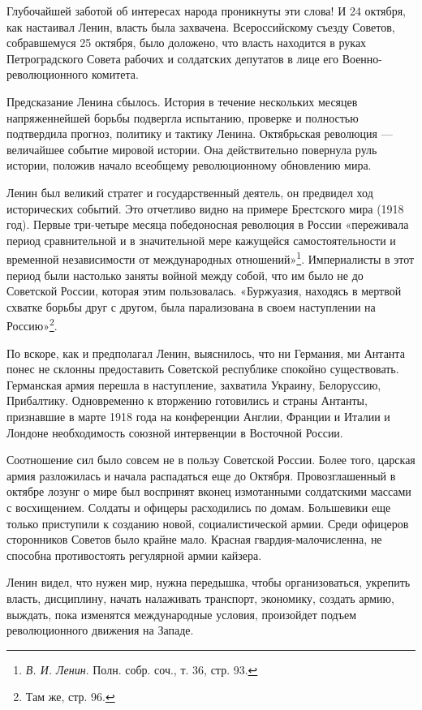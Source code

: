 \documentclass[12pt, a4paper, openany]{book}
\begin{document}
Глубочайшей заботой об интересах народа проникнуты эти слова! И 24 октября, как настаивал Ленин, власть была захвачена. Всероссийскому съезду Советов, собравшемуся 25 октября, было доложено, что власть находится в руках Петроградского Совета рабочих и солдатских депутатов в лице его Военно-революционного комитета.

Предсказание Ленина сбылось. История в течение нескольких месяцев напряженнейшей борьбы подвергла испытанию, проверке и полностью подтвердила прогноз, политику и тактику Ленина. Октябрьская революция — величайшее событие мировой истории. Она действительно повернула руль истории, положив начало всеобщему революционному обновлению мира.

Ленин был великий стратег и государственный деятель, он предвидел ход исторических событий. Это отчетливо видно на примере Брестского мира (1918 год). Первые три-четыре месяца победоносная революция в России «переживала период сравнительной и в значительной мере кажущейся самостоятельности и временной независимости от международных отношений»\footnote{\textit{В. И. Ленин}. Полн. собр. соч., т. 36, стр. 93.}. Империалисты в этот период были настолько заняты войной между собой, что им было не до Советской России, которая этим пользовалась. «Буржуазия, находясь в мертвой схватке борьбы друг с другом, была парализована в своем наступлении на Россию»\footnote{Там же, стр. 96.}.

По вскоре, как и предполагал Ленин, выяснилось, что ни Германия, ми Антанта понес не склонны предоставить Советской республике спокойно существовать. Германская армия перешла в наступление, захватила Украину, Белоруссию, Прибалтику. Одновременно к вторжению готовились и страны Антанты, признавшие в марте 1918 года на конференции Англии, Франции и Италии и Лондоне необходимость союзной интервенции в Восточной России.

Соотношение сил было совсем не в пользу Советской России. Более того, царская армия разложилась и начала распадаться еще до Октября. Провозглашенный в октябре лозунг о мире был воспринят вконец измотанными солдатскими массами с восхищением. Солдаты и офицеры расходились по домам. Большевики еще только приступили к созданию новой, социалистической армии. Среди офицеров сторонников Советов было крайне мало. Красная гвардия-малочисленна, не способна противостоять регулярной армии кайзера.

Ленин видел, что нужен мир, нужна передышка, чтобы организоваться, укрепить власть, дисциплину, начать налаживать транспорт, экономику, создать армию, выждать, пока изменятся международные условия, произойдет подъем революционного движения на Западе.
\end{document}
